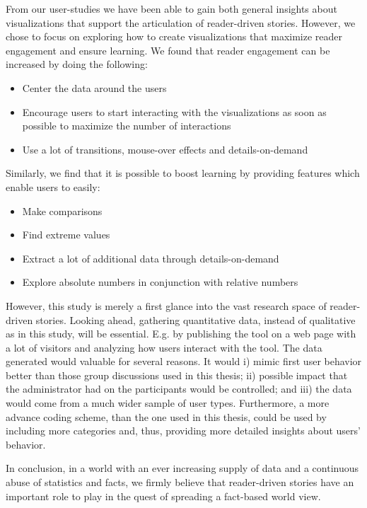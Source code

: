\documentclass{acmtog} %
\begin{document}
From our user-studies we have been able to gain both general insights about visualizations that support the articulation of reader-driven stories. However, we chose to focus on exploring how to create visualizations that maximize reader engagement and ensure learning. We found that reader engagement can be increased by doing the following:
\begin{itemize}
\item Center the data around the users
\item Encourage users to start interacting with the visualizations as soon as possible to maximize the number of interactions
\item Use a lot of transitions, mouse-over effects and details-on-demand
\end{itemize}
Similarly, we find that it is possible to boost learning by providing features which enable users to easily:
\begin{itemize}
\item Make comparisons
\item Find extreme values
\item Extract a lot of additional data through details-on-demand
\item Explore absolute numbers in conjunction with relative numbers
\end{itemize}

However, this study is merely a first glance into the vast research space of reader-driven stories. Looking ahead, gathering quantitative data, instead of qualitative as in this study, will be essential. E.g. by publishing the tool on a web page with a lot of visitors and analyzing how users interact with the tool. The data generated would valuable for several reasons. It would i) mimic first user behavior better than those group discussions used in this thesis; ii) possible impact that the administrator had on the participants would be controlled; and iii) the data would come from a much wider sample of user types. Furthermore, a more advance coding scheme, than the one used in this thesis, could be used by including more categories and, thus, providing more detailed insights about users' behavior. 

In conclusion, in a world with an ever increasing supply of data and a continuous abuse of statistics and facts, we firmly believe that reader-driven stories have an important role to play in the quest of spreading a fact-based world view.

\end{document}

